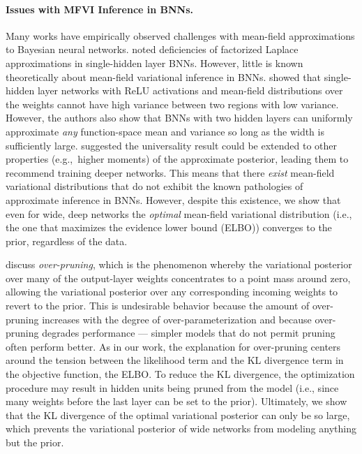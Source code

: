 \documentclass[twoside]{article}
\theoremstyle{theoremstyle}
\begin{document}
	\paragraph{Issues with MFVI Inference in BNNs.}
	 Many works have empirically observed challenges with mean-field  approximations to Bayesian neural networks.  noted deficiencies of factorized Laplace approximations in single-hidden layer BNNs. However, little is known theoretically about mean-field variational inference in BNNs.   showed that single-hidden layer networks with ReLU activations and mean-field distributions over the weights cannot have high variance between two regions with low variance. However, the authors also show that BNNs with two hidden layers can uniformly approximate \textit{any} function-space mean and variance so long as the width is sufficiently large. \cite{farquhar_2020} suggested the universality result could be extended to other properties (e.g.,~higher moments) of the approximate posterior, leading them to recommend training deeper networks. This means that there \textit{exist} mean-field variational distributions that do not exhibit the known pathologies of approximate inference in BNNs. However, despite this existence, we show that even for wide, deep networks the \textit{optimal} mean-field variational distribution (i.e., the one that maximizes the evidence lower bound (ELBO)) converges to the prior, regardless of the data. 
	 
\vspace{1em} %
\citet{trippe_2018} discuss \textit{over-pruning}, which is the phenomenon whereby the variational posterior over many of the output-layer weights concentrates to a point mass around zero, allowing the variational posterior over any corresponding incoming weights to revert to the prior.  This is undesirable behavior because the amount of over-pruning increases with the degree of over-parameterization and because over-pruning degrades performance --- simpler models that do not permit pruning often perform better. As in our work, the explanation for over-pruning centers around the tension between the likelihood term and the KL divergence term in the objective function, the ELBO. 
To reduce the KL divergence, the optimization procedure may result in hidden units being pruned from the model (i.e., since many weights before the last layer can be set to the prior). Ultimately, we show that the KL divergence of the optimal variational posterior can only be so large, which prevents the variational posterior of wide networks from modeling anything but the prior. 
\end{document}
